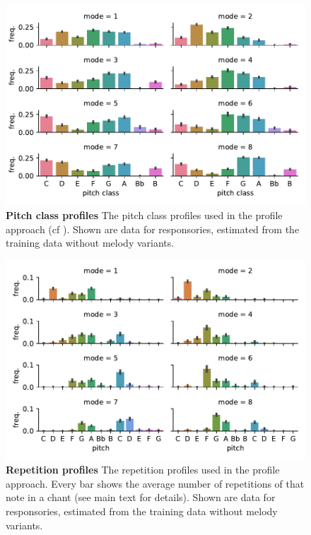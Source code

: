 \documentclass{article}
\begin{document}
\begin{figure}
    \centering
    \includegraphics[width=.7\textwidth]{figs/figS07-pitch-class-profiles.pdf}
    \caption{
        \textbf{Pitch class profiles}
        The pitch class profiles used in the profile approach (cf \cite{Huron2006a}). Shown are data for responsories, estimated from the training data without melody variants.
        \label{suppl:pitch-class-profiles}
    }
\end{figure}

\begin{figure}
    \centering
    \includegraphics[width=.7\textwidth]{figs/figS08-repetition-profiles.pdf}
    \caption{
        \textbf{Repetition profiles}
        The repetition profiles used in the profile approach.
        Every bar shows the average number of repetitions of that note in a chant (see main text for details).
        Shown are data for responsories, estimated from the training data without melody variants.
        \label{suppl:repetition-profiles}
    }
\end{figure}
\end{document}
